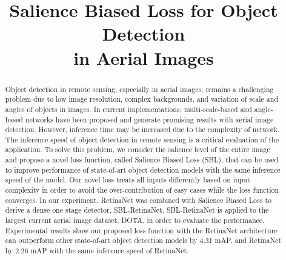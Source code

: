 \documentclass[conference]{IEEEtran}
\begin{document}
\title{Salience Biased Loss for Object Detection \\
		 in Aerial Images \\
}

\author{

}

\maketitle

\begin{abstract}
    Object detection in remote sensing, especially in aerial images, remains a challenging problem due to low image resolution, complex backgrounds, and variation of scale and angles of objects in images. In current implementations, multi-scale-based and angle-based networks have been proposed and generate promising results with aerial image detection. However, inference time may be increased due to the complexity of network. The inference speed of object detection in remote sensing is a critical evaluation of the application. To solve this problem, we consider the salience level of the entire image and propose a novel loss function, called Salience Biased Loss (SBL), that can be used to improve performance of state-of-art object detection models with the same inference speed of the model. Our novel loss treats all inputs differently based on input complexity in order to avoid the over-contribution of easy cases while the loss function converges. In our experiment, RetinaNet was combined with Salience Biased Loss to derive a dense one stage detector, SBL-RetinaNet. SBL-RetinaNet is applied to the largest current aerial image dataset, DOTA, in order to evaluate the performance. Experimental results show our proposed loss function with the RetinaNet architecture can outperform other state-of-art object detection models by 4.31 mAP, and RetinaNet by 2.26 mAP with the same inference speed of RetinaNet. 
\end{abstract}
\end{document}
